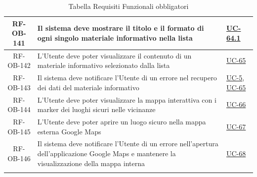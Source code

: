 \documentclass[a4paper,12pt]{article}
\begin{document}
\begin{center}
\begin{longtable}{|c|p{8.5cm}|>{\centering\arraybackslash}p{4cm}|}
RF-OB-141 & Il sistema deve mostrare il titolo e il formato di ogni singolo materiale informativo nella lista & \hyperref[subsec:UC-64.1]{UC-64.1} \\
\hline

RF-OB-142 & L'Utente deve poter visualizzare il contenuto di un materiale informativo selezionato dalla lista & \hyperref[sec:UC-65]{UC-65} \\
\hline

RF-OB-143 & Il sistema deve notificare l'Utente di un errore nel recupero dei dati del materiale informativo & \hyperref[sec:UC-5]{UC-5}, \hyperref[sec:UC-65]{UC-65} \\
\hline

RF-OB-144 & L'Utente deve poter visualizzare la mappa interattiva con i marker dei luoghi sicuri nelle vicinanze & \hyperref[sec:UC-66]{UC-66} \\
\hline

RF-OB-145 & L'Utente deve poter aprire un luogo sicuro nella mappa esterna Google Maps & \hyperref[subsec:UC-67]{UC-67} \\
\hline

RF-OB-146 & Il sistema deve notificare l'Utente di un errore nell'apertura dell'applicazione Google Maps e mantenere la visualizzazione della mappa interna & \hyperref[subsec:UC-68]{UC-68} \\
\hline
\caption{Tabella Requisiti Funzionali obbligatori} \label{tab:requisiti_funzionali_obbligatori} \\
\end{longtable}
\end{center}

\end{document}
